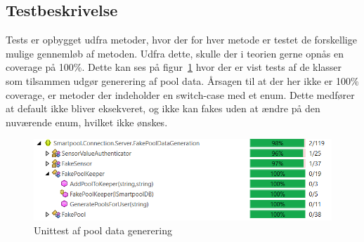 \subsection{Testbeskrivelse}
Tests er opbygget udfra metoder, hvor der for hver metode er testet de forskellige mulige gennemløb af metoden. Udfra dette, skulle der i teorien gerne opnås en coverage på 100\%. Dette kan ses på figur~\ref{fig:pooldatatest} hvor der er vist tests af de klasser som tilsammen udgør generering af pool data. Årsagen til at der her ikke er 100\% coverage, er metoder der indeholder en switch-case med et enum. Dette medfører at default ikke bliver eksekveret, og ikke kan fakes uden at ændre på den nuværende enum, hvilket ikke ønskes. 
\begin{figure}[H]
	\centering
	\includegraphics[width=0.9\linewidth]{figs/connection/pooldatatest.png}
	\caption{Unittest af pool data generering}
	\label{fig:pooldatatest}
\end{figure}